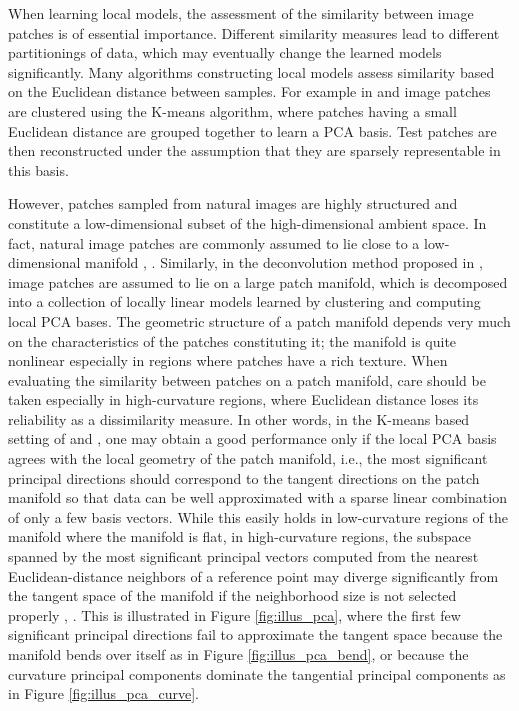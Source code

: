 \documentclass[journal]{IEEEtran}
\begin{document}
When learning local models, the assessment of the similarity between image patches is of essential importance. Different similarity measures lead to different partitionings of data, which may eventually change the learned models significantly. Many algorithms constructing local models assess similarity based on the Euclidean distance between samples. For example in \cite{Dong13nonlocally} and  \cite{Dong11image} image patches are clustered using the K-means algorithm, where patches having a small Euclidean distance are grouped together to learn a PCA basis. Test patches are then reconstructed under the assumption that they are sparsely representable in this basis. 

However, patches sampled from natural images are highly structured and constitute a low-dimensional subset of the high-dimensional ambient space. In fact, natural image patches are commonly assumed to lie close to a low-dimensional manifold \cite{Lee03the}, \cite{Peyre09manifold}. Similarly, in the deconvolution method proposed in \cite{Ni11example}, image patches are assumed to lie on a large patch manifold, which is decomposed into a collection of locally linear models learned by clustering and computing local PCA bases. The geometric structure of a patch manifold depends very much on the characteristics of the patches constituting it; the manifold is quite nonlinear especially in regions where patches have a rich texture. When evaluating the similarity between patches on a patch manifold, care should be taken especially in high-curvature regions, where Euclidean distance loses its reliability as a dissimilarity measure. 
In other words, in the K-means based setting of \cite{Dong13nonlocally} and  \cite{Dong11image}, one may obtain a good performance only if the local PCA basis agrees with the local geometry of the patch manifold, i.e., the most significant principal directions should correspond to the tangent directions on the patch manifold so that data can be well approximated with a sparse linear combination of only a few basis vectors. While this easily holds in low-curvature regions of the manifold where the manifold is flat, in high-curvature regions, the subspace spanned by the most significant principal vectors computed from the nearest Euclidean-distance neighbors of a reference point may diverge significantly from the tangent space of the manifold if the neighborhood size is not selected properly \cite{Kaslovsky12overcoming}, \cite{Tyagi13tangent}. This is illustrated in Figure \ref{fig:illus_pca}, where the first few significant principal directions fail to approximate the tangent space because the manifold bends over itself as in Figure \ref{fig:illus_pca_bend}, or because the curvature principal components dominate the tangential principal components as in Figure \ref{fig:illus_pca_curve}.
\end{document}
